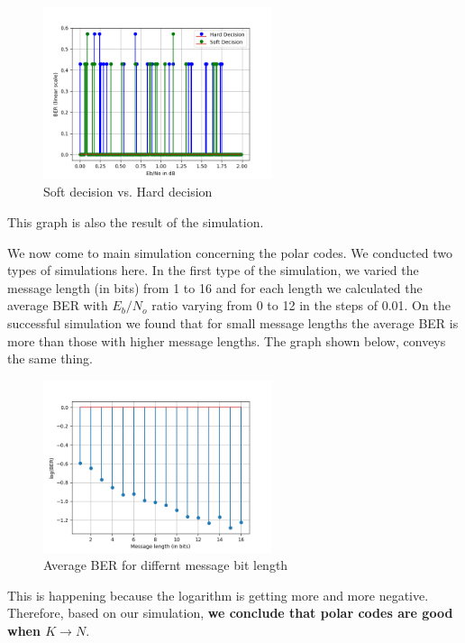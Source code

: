 \documentclass[twocolumn]{report}
\begin{document}
\begin{figure}[H]
\centering \includegraphics[width=0.6\textwidth, height=0.25\textheight]{hamming.png}
\caption{Soft decision vs. Hard decision}
\end{figure}
This graph is also the result of the simulation.
\par We now come to main simulation concerning the polar codes. We conducted two types of simulations here. In the first type of the simulation, we varied the message length (in bits) from 1 to 16 and for each length we calculated the average BER with $E_{b}/N_{o}$ ratio varying from 0 to 12 in the steps of 0.01. On the successful simulation we found that for small message lengths the average BER is more than those with higher message lengths. The graph shown below, conveys the same thing.
\begin{figure}[H]
\centering \includegraphics[width=0.6\textwidth, height=0.25\textheight]{polar1.png}
\caption{Average BER for differnt message bit length}
\end{figure}
This is happening because the logarithm is getting more and more negative. Therefore, based on our simulation, \textbf{we conclude that polar codes are good when $K \rightarrow N$}.
\end{document}
